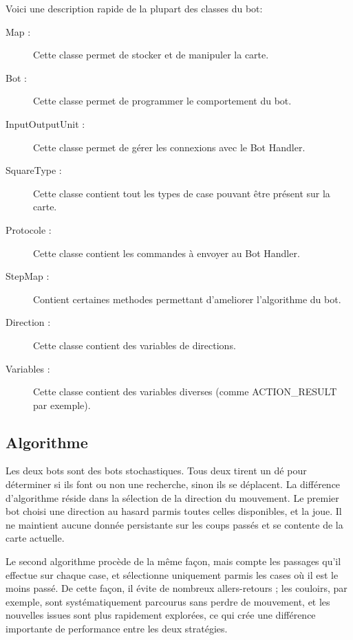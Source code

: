 Voici une description rapide de la plupart des classes du bot:

\begin{description}
\item[Map :] Cette classe permet de stocker et de manipuler la carte.
\item[Bot :] Cette classe permet de programmer le comportement du bot.
\item[InputOutputUnit :] Cette classe permet de gérer les connexions avec le Bot Handler.
\item[SquareType :] Cette classe contient tout les types de case pouvant être présent sur la carte.
\item[Protocole :] Cette classe contient les commandes à envoyer au Bot Handler.
\item[StepMap :] Contient certaines methodes permettant d'ameliorer l'algorithme du bot.
\item[Direction :] Cette classe contient des variables de directions.
\item[Variables :] Cette classe contient des variables diverses (comme ACTION\_RESULT par exemple).
\end{description} 

\subsection{Algorithme}

Les deux bots sont des bots stochastiques. Tous deux tirent un dé pour déterminer si ils font ou non une recherche, sinon ils se déplacent. La différence d'algorithme réside dans la sélection de la direction du mouvement. Le premier bot choisi une direction au hasard parmis toutes celles disponibles, et la joue. Il ne maintient aucune donnée persistante sur les coups passés et se contente de la carte actuelle.

Le second algorithme procède de la même façon, mais compte les passages qu'il effectue sur chaque case, et sélectionne uniquement parmis les cases où il est le moins passé. De cette façon, il évite de nombreux allers-retours ; les couloirs, par exemple, sont systématiquement parcourus sans perdre de mouvement, et les nouvelles issues sont plus rapidement explorées, ce qui crée une différence importante de performance entre les deux stratégies. 

\subsection{}
